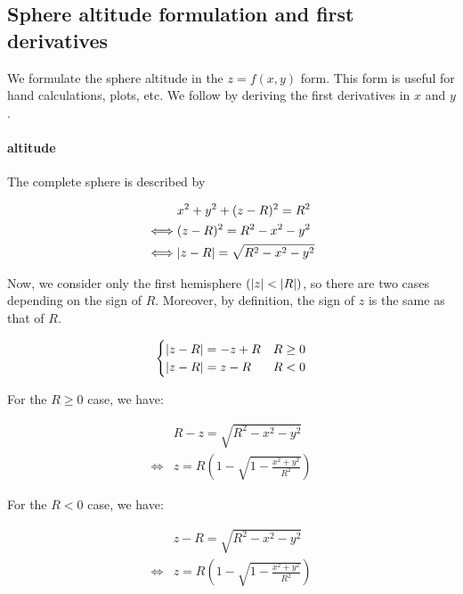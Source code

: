 \subsection{Sphere altitude formulation and first derivatives}
We formulate the sphere altitude in the $z = f(x, y)$ form. This form
is useful for hand calculations, plots, etc. We follow by deriving the
first derivatives in $x$ and $y$.

\paragraph{altitude}
The complete sphere is described by

\begin{equation}
\begin{split}
& x^2 + y^2 + (z - R)^2 = R^2 \\
\iff & (z - R)^2 = R^2 - x^2 - y^2 \\
\iff & \abs{z-R} = \sqrt{R^2 - x^2 - y^2}
\end{split} \end{equation}

Now, we consider only the first hemisphere $(\abs{z} < \abs{R})$, so
there are two cases depending on the sign of $R$. Moreover, by definition,
the sign of $z$ is the same as that of $R$.

\begin{equation} \begin{cases}
\abs{z - R} = -z + R & R \geq 0 \\
\abs{z - R} = z - R & R < 0
\end{cases} \end{equation}

For the $R \geq 0$ case, we have:

\begin{equation} \begin{split}
& R - z = \sqrt{R^2 -x^2 -y^2} \\
\iff & z = R \left( 1 - \sqrt{1 - \frac{x^2 + y^2}{R^2}} \right)
\end{split} \end{equation}

For the $R < 0$ case, we have:

\begin{equation} \begin{split}
& z - R = \sqrt{R^2 -x^2 -y^2} \\
\iff & z = R \left( 1 - \sqrt{1 - \frac{x^2 + y^2}{R^2}} \right)
\end{split} \end{equation}

